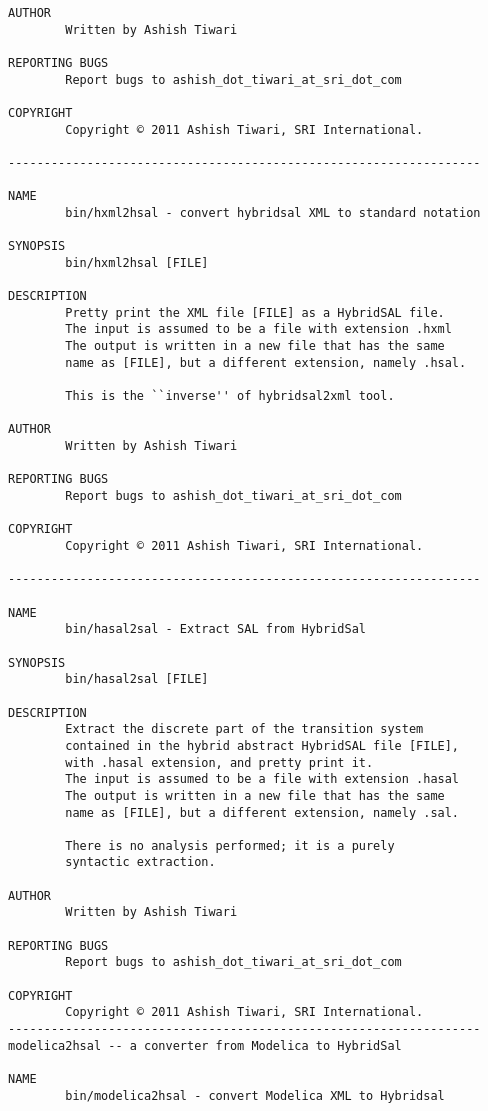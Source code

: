 \documentclass{llncs}
\begin{document}
\begin{tt}
\begin{verbatim}
AUTHOR
        Written by Ashish Tiwari

REPORTING BUGS
        Report bugs to ashish_dot_tiwari_at_sri_dot_com

COPYRIGHT
        Copyright © 2011 Ashish Tiwari, SRI International.

------------------------------------------------------------------

NAME
        bin/hxml2hsal - convert hybridsal XML to standard notation

SYNOPSIS
        bin/hxml2hsal [FILE]

DESCRIPTION
        Pretty print the XML file [FILE] as a HybridSAL file.
        The input is assumed to be a file with extension .hxml
        The output is written in a new file that has the same
        name as [FILE], but a different extension, namely .hsal.

        This is the ``inverse'' of hybridsal2xml tool.

AUTHOR
        Written by Ashish Tiwari

REPORTING BUGS
        Report bugs to ashish_dot_tiwari_at_sri_dot_com

COPYRIGHT
        Copyright © 2011 Ashish Tiwari, SRI International.

------------------------------------------------------------------

NAME
        bin/hasal2sal - Extract SAL from HybridSal

SYNOPSIS
        bin/hasal2sal [FILE]

DESCRIPTION
        Extract the discrete part of the transition system 
        contained in the hybrid abstract HybridSAL file [FILE], 
        with .hasal extension, and pretty print it.
        The input is assumed to be a file with extension .hasal
        The output is written in a new file that has the same
        name as [FILE], but a different extension, namely .sal.

        There is no analysis performed; it is a purely 
        syntactic extraction.

AUTHOR
        Written by Ashish Tiwari

REPORTING BUGS
        Report bugs to ashish_dot_tiwari_at_sri_dot_com

COPYRIGHT
        Copyright © 2011 Ashish Tiwari, SRI International.
------------------------------------------------------------------
modelica2hsal -- a converter from Modelica to HybridSal

NAME
        bin/modelica2hsal - convert Modelica XML to Hybridsal 


\end{verbatim}
\end{tt}
\end{document}
